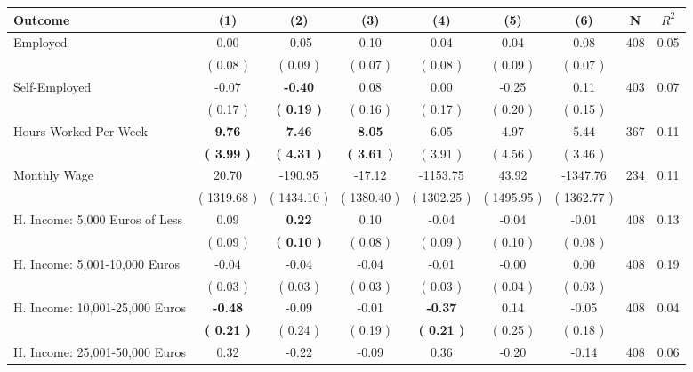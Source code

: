 \begin{tabular}{lcccccccc}
\toprule
 \textbf{Outcome} & \textbf{(1)} & \textbf{(2)} & \textbf{(3)} & \textbf{(4)} & \textbf{(5)} & \textbf{(6)} & \textbf{N} & \textbf{$ R^2$} \\
\midrule
Employed &      0.00 &     -0.05 &      0.10 &      0.04 &      0.04 &      0.08 & 408 &       0.05 \\ 
 & (     0.08 ) & (     0.09 ) & (     0.07 ) & (     0.08 ) & (     0.09 ) & (     0.07 ) & \\
Self-Employed &     -0.07 & \textbf{    -0.40} &      0.08 &      0.00 &     -0.25 &      0.11 & 403 &       0.07 \\ 
 & (     0.17 ) & \textbf{(     0.19 )} & (     0.16 ) & (     0.17 ) & (     0.20 ) & (     0.15 ) & \\
Hours Worked Per Week & \textbf{     9.76} & \textbf{     7.46} & \textbf{     8.05} &      6.05 &      4.97 &      5.44 & 367 &       0.11 \\ 
 & \textbf{(     3.99 )} & \textbf{(     4.31 )} & \textbf{(     3.61 )} & (     3.91 ) & (     4.56 ) & (     3.46 ) & \\
Monthly Wage &     20.70 &   -190.95 &    -17.12 &  -1153.75 &     43.92 &  -1347.76 & 234 &       0.11 \\ 
 & (  1319.68 ) & (  1434.10 ) & (  1380.40 ) & (  1302.25 ) & (  1495.95 ) & (  1362.77 ) & \\
H. Income: 5,000 Euros of Less &      0.09 & \textbf{     0.22} &      0.10 &     -0.04 &     -0.04 &     -0.01 & 408 &       0.13 \\ 
 & (     0.09 ) & \textbf{(     0.10 )} & (     0.08 ) & (     0.09 ) & (     0.10 ) & (     0.08 ) & \\
H. Income: 5,001-10,000 Euros &     -0.04 &     -0.04 &     -0.04 &     -0.01 &     -0.00 &      0.00 & 408 &       0.19 \\ 
 & (     0.03 ) & (     0.03 ) & (     0.03 ) & (     0.03 ) & (     0.04 ) & (     0.03 ) & \\
H. Income: 10,001-25,000 Euros & \textbf{    -0.48} &     -0.09 &     -0.01 & \textbf{    -0.37} &      0.14 &     -0.05 & 408 &       0.04 \\ 
 & \textbf{(     0.21 )} & (     0.24 ) & (     0.19 ) & \textbf{(     0.21 )} & (     0.25 ) & (     0.18 ) & \\
H. Income: 25,001-50,000 Euros &      0.32 &     -0.22 &     -0.09 &      0.36 &     -0.20 &     -0.14 & 408 &       0.06 \\ 

\end{tabular}
